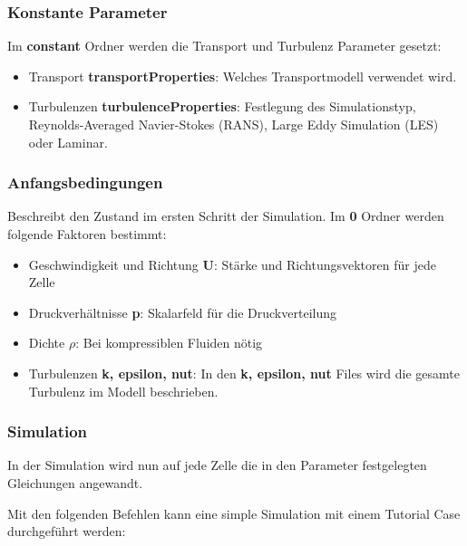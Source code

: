 \subsubsection{Konstante Parameter\label{openfoam:section:Konstante Parameter}}
Im \textbf{constant} Ordner werden die Transport und Turbulenz Parameter gesetzt:
\begin{itemize}
    \item Transport \textbf{transportProperties}: Welches Transportmodell verwendet wird.
    \item Turbulenzen \textbf{turbulenceProperties}: Festlegung des Simulationstyp, Reynolds-Averaged Navier-Stokes (RANS), Large Eddy Simulation (LES) oder Laminar.
\end{itemize}

\subsubsection{Anfangsbedingungen \label{openfoam:section:Anfangsbedingungen}}
Beschreibt den Zustand im ersten Schritt der Simulation. Im \textbf{0} Ordner werden folgende Faktoren bestimmt:
\begin{itemize}
    \item Geschwindigkeit und Richtung \textbf{U}: Stärke und Richtungsvektoren für jede Zelle
    \item Druckverhältnisse \textbf{p}: Skalarfeld für die Druckverteilung
    \item Dichte $\rho$: Bei kompressiblen Fluiden nötig %
    \item Turbulenzen \textbf{k, epsilon, nut}: In den \textbf{k, epsilon, nut} Files wird die gesamte Turbulenz im Modell beschrieben.  
\end{itemize}

\subsubsection{Simulation\label{openfoam:section:Simulation}}
In der Simulation wird nun auf jede Zelle die in den Parameter festgelegten Gleichungen angewandt. 

Mit den folgenden Befehlen kann eine simple Simulation mit einem Tutorial Case durchgeführt werden:


